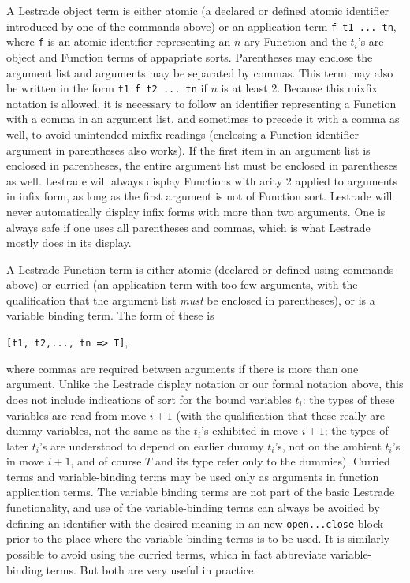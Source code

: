 \documentclass[12pt]{article}
\begin{document}
A Lestrade object term is either atomic (a declared or defined atomic identifier introduced by one of the commands above) or an application term {\tt f t1 ... tn}, where {\tt f} is an atomic identifier representing an $n$-ary Function and the
$t_i$'s are object and Function terms of appapriate sorts.  Parentheses may enclose the argument list and arguments may be separated by commas.  This term may also be written in the form {\tt t1 f t2 ... tn} if $n$ is at least 2.  Because this mixfix
notation is allowed, it is necessary to follow an identifier representing a Function with a comma in an argument list, and sometimes to precede it with a comma as well, to avoid unintended mixfix readings (enclosing a Function identifier argument in parentheses also works).  If the first item in an argument list is
enclosed in parentheses, the entire argument list must be enclosed in parentheses as well.  Lestrade will always display Functions with arity 2 applied to arguments in infix form, as long as the first argument is not of Function sort.  Lestrade will never automatically display infix forms with more than two arguments.  One is always safe if one uses all parentheses and commas, which is what Lestrade mostly does in its display.

A Lestrade Function term is either atomic (declared or defined using commands above) or curried (an application term with too few arguments, with the qualification that the argument list {\em must} be enclosed in parentheses), or is a variable binding term.
The form of these is \begin{center}{\tt [t1, t2,..., tn => T]},\end{center} where commas are required between arguments if there is more than one argument.  Unlike the Lestrade display notation or our formal notation above, this does not include indications of sort for
the bound variables $t_i$:  the types of these variables are read from move $i+1$ (with the qualification that these really are dummy variables, not the same as the $t_i$'s exhibited in move $i+1$; the types of later $t_i$'s are understood to depend on earlier dummy $t_i$'s, not on the ambient $t_i$'s in move $i+1$, and of course $T$ and its type refer only to the dummies).  Curried terms and variable-binding terms may be used only as arguments in function application terms.  The variable binding terms are not part of the basic Lestrade functionality, and use of the variable-binding terms can always be
avoided by defining an identifier with the desired meaning in an new {\tt open...close} block prior to the place where the variable-binding terms is to be used.   It is similarly possible to avoid using the curried terms, which in fact abbreviate variable-binding terms.  But both are very useful in practice.
\end{document}
